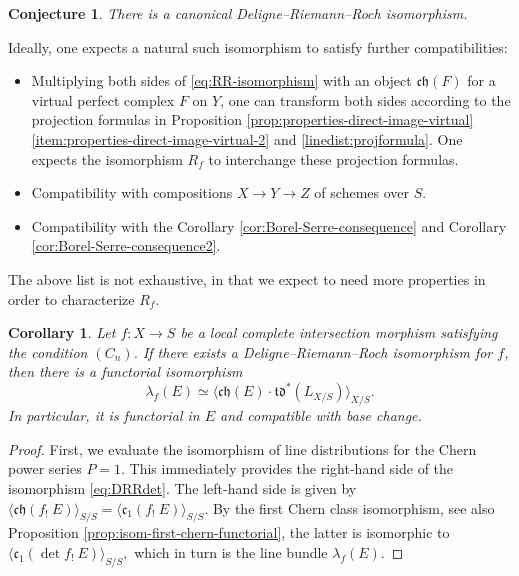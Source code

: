 \documentclass[JEP,XML,SOM,Unicode,published]{cedram}
\theoremstyle{plain}
\newtheorem{corollary}[theorem]{Corollary}
\newtheorem*{conjecture}{Conjecture}
\theoremstyle{definition}
\newcommand{\cfrak}{\mathfrak c}
\newcommand{\chfrak}{\mathfrak {ch}}
\newcommand{\tdfrak}{\mathfrak {td}}
\begin{document}
\begin{conjecture}
There is a canonical Deligne--Riemann--Roch isomorphism.

\end{conjecture}
Ideally, one expects a natural such isomorphism to satisfy further compatibilities:

\begin{itemize}
\item Multiplying both sides of \eqref{eq:RR-isomorphism} with an object $\chfrak(F)$ for a virtual perfect complex $F$ on $Y$, one can transform both sides according to the projection formulas in Proposition \ref{prop:properties-direct-image-virtual}\eqref{item:properties-direct-image-virtual-2} and \eqref{linedist:projformula}. One expects the isomorphism $R_{f}$ to interchange these projection formulas.
\item Compatibility with compositions $X \to Y \to Z$ of schemes over $S$.
\item Compatibility with the Corollary \ref{cor:Borel-Serre-consequence} and Corollary \ref{cor:Borel-Serre-consequence2}.
\end{itemize}
The above list is not exhaustive, in that we expect to need more properties in order to characterize $R_{f}$.

\begin{corollary}
Let $f: X \to S$ be a local complete intersection morphism satisfying the condition $(C_n)$. If there exists a Deligne--Riemann--Roch isomorphism for $f$, then there is a functorial isomorphism
\begin{equation}\label{eq:DRRdet}
\lambda_{f}(E) \simeq \langle \chfrak(E) \cdot \tdfrak^{\ast}(L_{X/S}) \rangle_{X/S}.
\end{equation}
In particular, it is functorial in $E$ and compatible with base change.
\end{corollary}

\begin{proof}
First, we evaluate the isomorphism of line distributions for the Chern power series $P = 1$. This immediately provides the right-hand side of the isomorphism \eqref{eq:DRRdet}. The left-hand side is given by $\langle \chfrak(f_!\ E) \rangle_{S/S} = \langle \cfrak_1(f_!\ E) \rangle_{S/S} $. By the first Chern class isomorphism, see also Proposition \ref{prop:isom-first-chern-functorial}, the latter is isomorphic to $ \langle \cfrak_1(\det f_!\ E) \rangle_{S/S}, $ which in turn is the line bundle $\lambda_{f}(E)$.
\end{proof}

\backmatter


\end{document}
